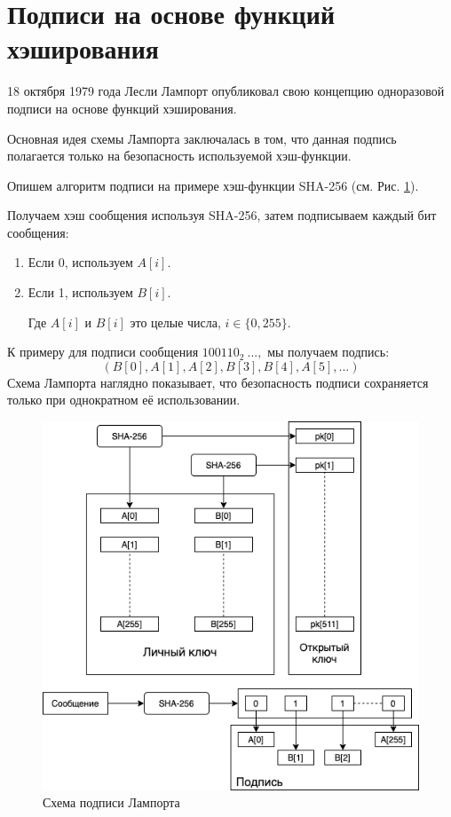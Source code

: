 \documentclass[a4paper, 14pt]{extarticle}
\begin{document}
\newpage

\section{Подписи на основе функций хэширования}
18 октября 1979 года Лесли Лампорт опубликовал свою концепцию одноразовой подписи на основе функций хэширования.

Основная идея схемы Лампорта заключалась в том, что данная подпись полагается только на безопасность используемой хэш-функции.

Опишем алгоритм подписи на примере хэш-функции SHA-256 (см. Рис. \ref{fig:lamport}).

Получаем хэш сообщения используя SHA-256, затем подписываем каждый бит сообщения:

\begin{enumerate}
    \item Если 0, используем $A[i]$.
    \item Если 1, используем $B[i]$.

    Где $A[i]$ и $B[i]$ это целые числа, $i \in \{0, 255\}$.
\end{enumerate}

К примеру для подписи сообщения $100110_{2}\ ...,$ мы получаем подпись:
\[(B[0], A[1], A[2], B[3], B[4], A[5], ...)\]
Схема Лампорта наглядно показывает, что безопасность подписи сохраняется только при однократном её использовании.

\begin{figure}[h]
    \centering
    \includegraphics[scale=0.71]{lamport.png}
    \caption{Схема подписи Лампорта}
    \label{fig:lamport}
\end{figure}
\end{document}

